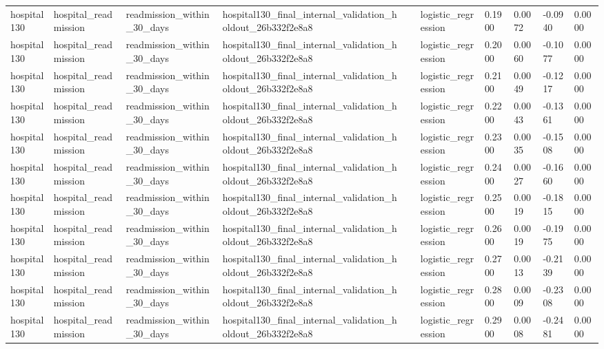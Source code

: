 \begin{tabular}{llllllllll}
hospital130 & hospital\_readmission & readmission\_within\_30\_days & hospital130\_final\_internal\_validation\_holdout\_26b332f2e8a8 &  & logistic\_regression & 0.1900 & 0.0072 & -0.0940 & 0.0000 \\
hospital130 & hospital\_readmission & readmission\_within\_30\_days & hospital130\_final\_internal\_validation\_holdout\_26b332f2e8a8 &  & logistic\_regression & 0.2000 & 0.0060 & -0.1077 & 0.0000 \\
hospital130 & hospital\_readmission & readmission\_within\_30\_days & hospital130\_final\_internal\_validation\_holdout\_26b332f2e8a8 &  & logistic\_regression & 0.2100 & 0.0049 & -0.1217 & 0.0000 \\
hospital130 & hospital\_readmission & readmission\_within\_30\_days & hospital130\_final\_internal\_validation\_holdout\_26b332f2e8a8 &  & logistic\_regression & 0.2200 & 0.0043 & -0.1361 & 0.0000 \\
hospital130 & hospital\_readmission & readmission\_within\_30\_days & hospital130\_final\_internal\_validation\_holdout\_26b332f2e8a8 &  & logistic\_regression & 0.2300 & 0.0035 & -0.1508 & 0.0000 \\
hospital130 & hospital\_readmission & readmission\_within\_30\_days & hospital130\_final\_internal\_validation\_holdout\_26b332f2e8a8 &  & logistic\_regression & 0.2400 & 0.0027 & -0.1660 & 0.0000 \\
hospital130 & hospital\_readmission & readmission\_within\_30\_days & hospital130\_final\_internal\_validation\_holdout\_26b332f2e8a8 &  & logistic\_regression & 0.2500 & 0.0019 & -0.1815 & 0.0000 \\
hospital130 & hospital\_readmission & readmission\_within\_30\_days & hospital130\_final\_internal\_validation\_holdout\_26b332f2e8a8 &  & logistic\_regression & 0.2600 & 0.0019 & -0.1975 & 0.0000 \\
hospital130 & hospital\_readmission & readmission\_within\_30\_days & hospital130\_final\_internal\_validation\_holdout\_26b332f2e8a8 &  & logistic\_regression & 0.2700 & 0.0013 & -0.2139 & 0.0000 \\
hospital130 & hospital\_readmission & readmission\_within\_30\_days & hospital130\_final\_internal\_validation\_holdout\_26b332f2e8a8 &  & logistic\_regression & 0.2800 & 0.0009 & -0.2308 & 0.0000 \\
hospital130 & hospital\_readmission & readmission\_within\_30\_days & hospital130\_final\_internal\_validation\_holdout\_26b332f2e8a8 &  & logistic\_regression & 0.2900 & 0.0008 & -0.2481 & 0.0000 \\

\end{tabular}
